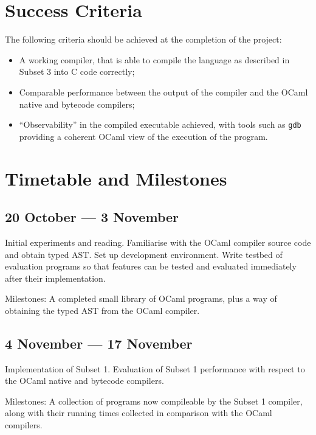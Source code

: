 \section*{Success Criteria}

The following criteria should be achieved at the completion of the project:

\begin{itemize}

    \item A working compiler, that is able to compile the language as described
        in Subset 3 into C code correctly;

    \item Comparable performance between the output of the compiler and the
        OCaml native and bytecode compilers;

    \item ``Observability'' in the compiled executable achieved, with tools
        such as \texttt{gdb} providing a coherent OCaml view of the execution
        of the program.

\end{itemize}

\section*{Timetable and Milestones}

\subsection*{20 October --- 3 November}

Initial experiments and reading. Familiarise with the OCaml compiler source
code and obtain typed AST\@. Set up development environment. Write testbed of
evaluation programs so that features can be tested and evaluated immediately
after their implementation.

Milestones: A completed small library of OCaml programs, plus a way of
obtaining the typed AST from the OCaml compiler.

\subsection*{4 November --- 17 November}

Implementation of Subset 1. Evaluation of Subset 1 performance with respect to
the OCaml native and bytecode compilers.

Milestones: A collection of programs now compileable by the Subset 1 compiler,
along with their running times collected in comparison with the OCaml
compilers.

